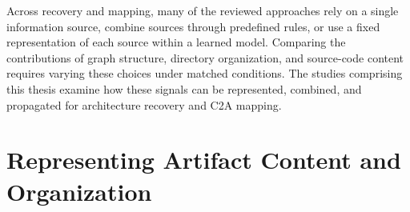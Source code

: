 Across recovery and mapping, many of the reviewed approaches rely on a single information source, combine sources through predefined rules, or use a fixed representation of each source within a learned model. Comparing the contributions of graph structure, directory organization, and source-code content requires varying these choices under matched conditions. The studies comprising this thesis examine how these signals can be represented, combined, and propagated for architecture recovery and C2A mapping.

\section[Representing Artifact Content]{Representing Artifact Content and Organization \label{sec:bg_content}}

